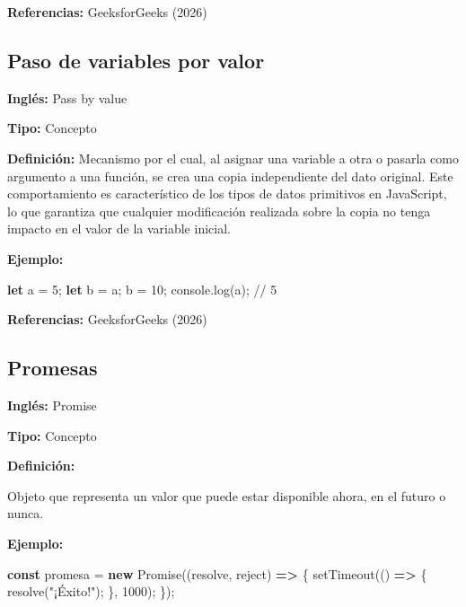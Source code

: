 \documentclass[
  letterpaper,
  DIV=11,
  numbers=noendperiod]{scrreprt}
\newenvironment{Shaded}{\begin{snugshade}}{\end{snugshade}}
\newcommand{\BuiltInTok}[1]{\textcolor[rgb]{0.00,0.23,0.31}{#1}}
\newcommand{\CommentTok}[1]{\textcolor[rgb]{0.37,0.37,0.37}{#1}}
\newcommand{\DecValTok}[1]{\textcolor[rgb]{0.68,0.00,0.00}{#1}}
\newcommand{\FunctionTok}[1]{\textcolor[rgb]{0.28,0.35,0.67}{#1}}
\newcommand{\KeywordTok}[1]{\textcolor[rgb]{0.00,0.23,0.31}{\textbf{#1}}}
\newcommand{\NormalTok}[1]{\textcolor[rgb]{0.00,0.23,0.31}{#1}}
\newcommand{\OperatorTok}[1]{\textcolor[rgb]{0.37,0.37,0.37}{#1}}
\newcommand{\PreprocessorTok}[1]{\textcolor[rgb]{0.68,0.00,0.00}{#1}}
\newcommand{\StringTok}[1]{\textcolor[rgb]{0.13,0.47,0.30}{#1}}
\let\oldsubsection\subsection
\renewcommand{\subsection}{\phantomsection\oldsubsection}
\begin{document}
\textbf{Referencias:} GeeksforGeeks (2026)

\subsection*{Paso de variables por valor}\label{glos-valor}

\textbf{Inglés:} Pass by value

\textbf{Tipo:} Concepto

\textbf{Definición:} Mecanismo por el cual, al asignar una variable a
otra o pasarla como argumento a una función, se crea una copia
independiente del dato original. Este comportamiento es característico
de los tipos de datos primitivos en JavaScript, lo que garantiza que
cualquier modificación realizada sobre la copia no tenga impacto en el
valor de la variable inicial.

\textbf{Ejemplo:}

\begin{Shaded}
\begin{Highlighting}[]
\KeywordTok{let}\NormalTok{ a }\OperatorTok{=} \DecValTok{5}\OperatorTok{;}
\KeywordTok{let}\NormalTok{ b }\OperatorTok{=}\NormalTok{ a}\OperatorTok{;}
\NormalTok{b }\OperatorTok{=} \DecValTok{10}\OperatorTok{;}
\BuiltInTok{console}\OperatorTok{.}\FunctionTok{log}\NormalTok{(a)}\OperatorTok{;} \CommentTok{// 5}
\end{Highlighting}
\end{Shaded}

\textbf{Referencias:} GeeksforGeeks (2026)

\subsection*{Promesas}\label{glos-promesa}

\textbf{Inglés:} Promise

\textbf{Tipo:} Concepto

\textbf{Definición:}

Objeto que representa un valor que puede estar disponible ahora, en el
futuro o nunca.

\textbf{Ejemplo:}

\begin{Shaded}
\begin{Highlighting}[]
\KeywordTok{const}\NormalTok{ promesa }\OperatorTok{=} \KeywordTok{new} \BuiltInTok{Promise}\NormalTok{((resolve}\OperatorTok{,}\NormalTok{ reject) }\KeywordTok{=\textgreater{}}\NormalTok{ \{}
  \PreprocessorTok{setTimeout}\NormalTok{(() }\KeywordTok{=\textgreater{}}\NormalTok{ \{}
    \FunctionTok{resolve}\NormalTok{(}\StringTok{"¡Éxito!"}\NormalTok{)}\OperatorTok{;}
\NormalTok{  \}}\OperatorTok{,} \DecValTok{1000}\NormalTok{)}\OperatorTok{;}
\NormalTok{\})}\OperatorTok{;}
\end{Highlighting}
\end{Shaded}
\end{document}

